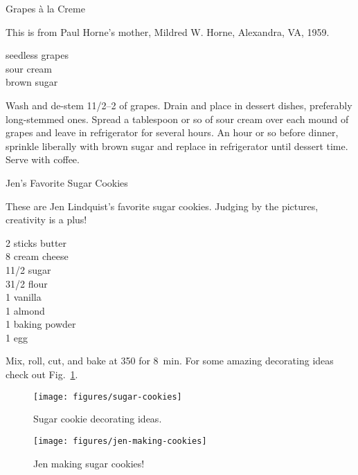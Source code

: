 \begin{entry}{Grapes \`{a} la Creme}

\begin{open}
    This is from Paul Horne's mother, Mildred W. Horne, Alexandra, VA, 1959.
\end{open}
\begin{ingredients}
    seedless grapes\\
    sour cream\\
    brown sugar
\end{ingredients}
Wash and de-stem 1\SIrange{1/2}{2}{\pound} of grapes. Drain and place in dessert
dishes, preferably long-stemmed ones.  Spread a tablespoon or so of sour cream
over each mound of grapes and leave in refrigerator for several hours.  An hour
or so before dinner, sprinkle liberally with brown sugar and replace in
refrigerator until dessert time.  Serve with coffee.
\end{entry}

\begin{entry}{Jen's Favorite Sugar Cookies}

\begin{open}
  These are Jen Lindquist's favorite sugar cookies.  Judging by the pictures,
  creativity is a plus!
\end{open}
\begin{ingredients}
    2 sticks butter\\
    \SI{8}{\ounce} cream cheese\\
    1\SI{1/2}{\cup} sugar\\
    3\SI{1/2}{\cup} flour\\
    \SI{1}{\teaspoon} vanilla\\
    \SI{1}{\teaspoon} almond\\
    \SI{1}{\teaspoon} baking powder\\
    1 egg
\end{ingredients}
Mix, roll, cut, and bake at \SI{350}{\degreeF} for \SI{8}{\minute}.  For some
amazing decorating ideas check out Fig.~\ref{fig:sugar-cookie-decorating}.
\begin{figure}
    \centering
    \texttt{[image: figures/sugar-cookies]}
    \caption{Sugar cookie decorating ideas.}
    \label{fig:sugar-cookie-decorating}
\end{figure}
\begin{figure}[b]
    \centering
    \texttt{[image: figures/jen-making-cookies]}
    \caption{Jen making sugar cookies!}
\end{figure}
\end{entry}

